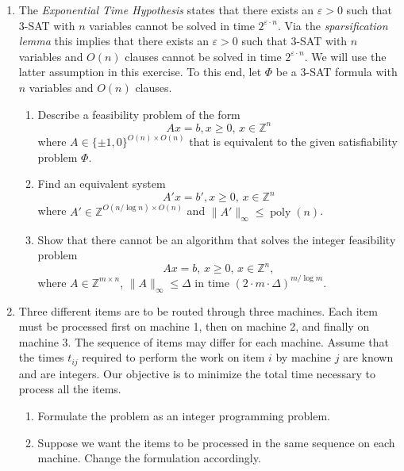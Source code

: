 \documentclass[11pt,a4paper]{article}
\DeclareMathOperator{\poly}{poly}
\begin{document}
\begin{enumerate}
\item The \emph{Exponential Time Hypothesis} states that there exists an $ε>0$ such that   $3$-SAT  with $n$ variables cannot be solved in time $2^{ε ⋅n}$. Via the \emph{sparsification lemma} this implies that there exists an $ε>0$ such that   $3$-SAT  with $n$ variables and $O(n)$ clauses cannot be solved in time $2^{ε ⋅n}$.  We will use the latter assumption in this exercise. To this end, let $Φ$ be a $3$-SAT formula with $n$ variables and $O(n)$ clauses. 
  \begin{enumerate}
  \item Describe a feasibility problem of the form
    \begin{displaymath}
      Ax = b, x≥0, \, x ∈ ℤ^n 
    \end{displaymath}
    where $A ∈ \{ \pm 1,0 \}^{O(n) × O(n)}$ that is equivalent to the given satisfiability problem $Φ$. 
  \item  Find an equivalent system
    \begin{displaymath}
      A'x = b', x≥0, \, x ∈ ℤ^n 
    \end{displaymath}
    where $A' ∈ ℤ^{O(n / \log n) × O(n)}$ and $\|A'\|_∞ ≤\poly (n)$.
  \item Show that there cannot be an algorithm that solves the integer feasibility problem
    \begin{displaymath}
      Ax = b, \, x≥ 0, \, x ∈ℤ^n, 
    \end{displaymath}
    where $A ∈ ℤ^{m ×n}$, $\|A\|_∞ ≤Δ$ in time $ (2 ⋅m ⋅Δ)^{m / \log m}$. 
    
  \end{enumerate}
  

\item Three different items are to be routed through three machines. Each item must be processed first on machine 1, then
on machine 2, and finally on machine 3. The sequence of items may differ for each machine. Assume that the times
$t_{ij}$ required to perform the work on item $i$ by machine $j$ are known and are integers. Our objective is to minimize the total time necessary to process all the items.
\begin{enumerate}
    \item Formulate the problem as an integer programming problem.
    \item Suppose we want the items to be processed in the same sequence on each machine. Change the formulation accordingly.
\end{enumerate}


\end{enumerate}
\end{document}

